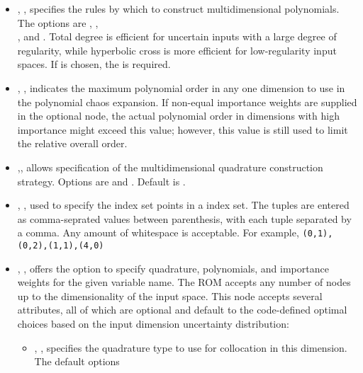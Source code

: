 \begin{itemize}
  \item {}, ,
  specifies the rules by which to construct multidimensional polynomials.  The options are
  , ,\\
  , and .
  Total degree is efficient for
  uncertain inputs with a large degree of regularity, while hyperbolic cross is more efficient
  for low-regularity input spaces.
  If  is chosen, the  is required.
  \item {}, ,
  indicates the maximum polynomial order in any one dimension to use in the
  polynomial chaos expansion. \nb If non-equal importance weights are supplied in the optional
   node, the actual polynomial order in dimensions with high
  importance might exceed this value; however, this value is still used to limit the
  relative overall order.
  \item {},, allows specification of the multidimensional
    quadrature construction strategy.  Options are  and .  Default is
    .
  \item {}, ,
  used to specify the index set points in a  index set.  The tuples are
  entered as comma-seprated values between parenthesis, with each tuple separated by a comma.
  Any amount of whitespace is acceptable.  For example, \verb'(0,1),(0,2),(1,1),(4,0)'
  \item {}, ,
  offers the option to specify quadrature, polynomials, and importance weights for the given
  variable name.  The ROM accepts any number of  nodes up to the
  dimensionality of the input space.  This node accepts several attributes, all of which are
  optional and default to
  the code-defined optimal choices based on the input dimension uncertainty distribution:
  \begin{itemize}
    \item {}, ,
      specifies the quadrature type to use for collocation in this dimension.  The default options

\end{itemize}
\end{itemize}
